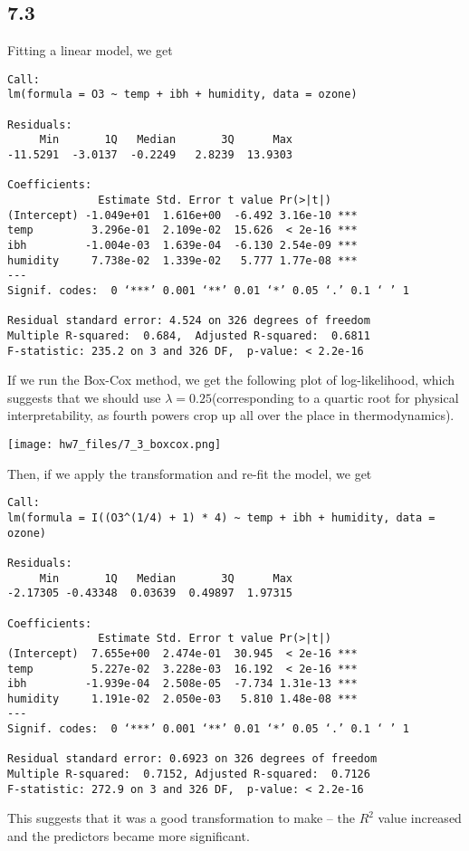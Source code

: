 \documentclass{article}
\begin{document}
\subsection*{7.3}
Fitting a linear model, we get 
\begin{verbatim}
Call:
lm(formula = O3 ~ temp + ibh + humidity, data = ozone)

Residuals:
     Min       1Q   Median       3Q      Max 
-11.5291  -3.0137  -0.2249   2.8239  13.9303 

Coefficients:
              Estimate Std. Error t value Pr(>|t|)    
(Intercept) -1.049e+01  1.616e+00  -6.492 3.16e-10 ***
temp         3.296e-01  2.109e-02  15.626  < 2e-16 ***
ibh         -1.004e-03  1.639e-04  -6.130 2.54e-09 ***
humidity     7.738e-02  1.339e-02   5.777 1.77e-08 ***
---
Signif. codes:  0 ‘***’ 0.001 ‘**’ 0.01 ‘*’ 0.05 ‘.’ 0.1 ‘ ’ 1

Residual standard error: 4.524 on 326 degrees of freedom
Multiple R-squared:  0.684,  Adjusted R-squared:  0.6811 
F-statistic: 235.2 on 3 and 326 DF,  p-value: < 2.2e-16
\end{verbatim}
If we run the Box-Cox method, we get the following plot of log-likelihood, which suggests that we should use $\lambda=0.25$(corresponding to a quartic root for physical interpretability, as fourth powers crop up all over the place in thermodynamics). 

\texttt{[image: hw7\_files/7\_3\_boxcox.png]}

Then, if we apply the transformation and re-fit the model, we get 

\begin{verbatim}
Call:
lm(formula = I((O3^(1/4) + 1) * 4) ~ temp + ibh + humidity, data = ozone)

Residuals:
     Min       1Q   Median       3Q      Max 
-2.17305 -0.43348  0.03639  0.49897  1.97315 

Coefficients:
              Estimate Std. Error t value Pr(>|t|)    
(Intercept)  7.655e+00  2.474e-01  30.945  < 2e-16 ***
temp         5.227e-02  3.228e-03  16.192  < 2e-16 ***
ibh         -1.939e-04  2.508e-05  -7.734 1.31e-13 ***
humidity     1.191e-02  2.050e-03   5.810 1.48e-08 ***
---
Signif. codes:  0 ‘***’ 0.001 ‘**’ 0.01 ‘*’ 0.05 ‘.’ 0.1 ‘ ’ 1

Residual standard error: 0.6923 on 326 degrees of freedom
Multiple R-squared:  0.7152, Adjusted R-squared:  0.7126 
F-statistic: 272.9 on 3 and 326 DF,  p-value: < 2.2e-16
\end{verbatim}
This suggests that it was a good transformation to make -- the $R^2$ value increased and the predictors became more significant.
\end{document}
